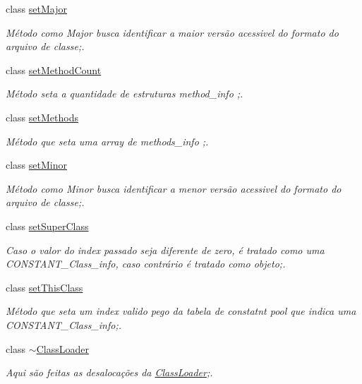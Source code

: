 \begin{DoxyCompactItemize}
class \hyperlink{class_class_loader_1_1set_major}{set\+Major}
\begin{DoxyCompactList}\small\item\em Método como Major busca identificar a maior versão acessivel do formato do arquivo de classe;. \end{DoxyCompactList}\item 
class \hyperlink{class_class_loader_1_1set_method_count}{set\+Method\+Count}
\begin{DoxyCompactList}\small\item\em Método seta a quantidade de estruturas method\+\_\+info ;. \end{DoxyCompactList}\item 
class \hyperlink{class_class_loader_1_1set_methods}{set\+Methods}
\begin{DoxyCompactList}\small\item\em Método que seta uma array de methods\+\_\+info ;. \end{DoxyCompactList}\item 
class \hyperlink{class_class_loader_1_1set_minor}{set\+Minor}
\begin{DoxyCompactList}\small\item\em Método como Minor busca identificar a menor versão acessivel do formato do arquivo de classe;. \end{DoxyCompactList}\item 
class \hyperlink{class_class_loader_1_1set_super_class}{set\+Super\+Class}
\begin{DoxyCompactList}\small\item\em Caso o valor do index passado seja diferente de zero, é tratado como uma C\+O\+N\+S\+T\+A\+N\+T\+\_\+\+Class\+\_\+info, caso contrário é tratado como objeto;. \end{DoxyCompactList}\item 
class \hyperlink{class_class_loader_1_1set_this_class}{set\+This\+Class}
\begin{DoxyCompactList}\small\item\em Método que seta um index valido pego da tabela de constatnt pool que indica uma C\+O\+N\+S\+T\+A\+N\+T\+\_\+\+Class\+\_\+info;. \end{DoxyCompactList}\item 
class \hyperlink{class_class_loader_1_1~_class_loader}{$\sim$\+Class\+Loader}
\begin{DoxyCompactList}\small\item\em Aqui são feitas as desalocações da \hyperlink{class_class_loader_1_1_class_loader}{Class\+Loader};. \end{DoxyCompactList}\end{DoxyCompactItemize}
